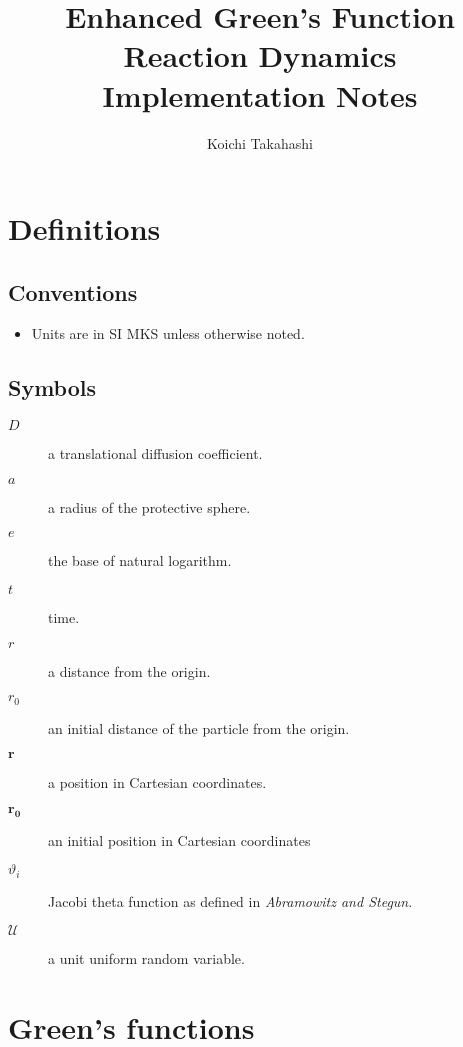 \documentclass[english]{article}
\begin{document}
\title{Enhanced Green's Function Reaction Dynamics Implementation Notes}


\author{Koichi Takahashi}

\maketitle

\section*{Definitions}


\subsection*{Conventions}

\begin{itemize}
\item Units are in SI MKS unless otherwise noted.
\end{itemize}

\subsection*{Symbols}

\begin{description}
\item [{$D$}] a translational diffusion coefficient.
\item [{$a$}] a radius of the protective sphere.
\item [{$e$}] the base of natural logarithm.
\item [{$t$}] time.
\item [{$r$}] a distance from the origin.
\item [{$r_{0}$}] an initial distance of the particle from the origin.
\item [{$\mathbf{r}$}] a position in Cartesian coordinates.
\item [{$\mathbf{r_{0}}$}] an initial position in Cartesian coordinates
\item [{\textmd{$\vartheta_{i}$}}] Jacobi theta function as defined in
\emph{Abramowitz and Stegun}.
\item [{$\mathcal{U}$}] a unit uniform random variable.
\end{description}

\section{Green's functions}
\end{document}
